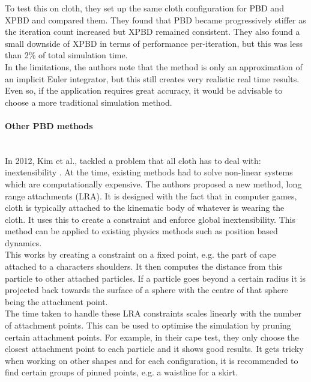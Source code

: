 \documentclass[12pt,a4paper]{article}
\begin{document}
To test this on cloth, they set up the same cloth configuration for PBD and XPBD and compared them. They found that PBD became progressively stiffer as the iteration count increased but XPBD remained consistent. They also found a small downside of XPBD in terms of performance per-iteration, but this was less than 2\% of total simulation time. \\

In the limitations, the authors note that the method is only an approximation of an implicit Euler integrator, but this still creates very realistic real time results. Even so, if the application requires great accuracy, it would be advisable to choose a more traditional simulation method.

\label{otherMethods}
\paragraph{Other PBD methods} \mbox{} \\
\label{t}
In 2012, Kim et al., tackled a problem that all cloth has to deal with: inextensibility \cite{longrange}. At the time, existing methods had to solve non-linear systems which are computationally expensive. The authors proposed a new method, long range attachments (LRA). It is designed with the fact that in computer games, cloth is typically attached to the kinematic body of whatever is wearing the cloth. It uses this to create a constraint and enforce global inextensibility. This method can be applied to existing physics methods such as position based dynamics.\\

This works by creating a constraint on a fixed point, e.g. the part of cape attached to a characters shoulders. It then computes the distance from this particle to other attached particles. If a particle goes beyond a certain radius it is projected back towards the surface of a sphere with the centre of that sphere being the attachment point.
\\

The time taken to handle these LRA constraints scales linearly with the number of attachment points. This can be used to optimise the simulation by pruning certain attachment points. For example, in their cape test, they only choose the closest attachment point to each particle and it shows good results. It gets tricky when working on other shapes and for each configuration, it is recommended to find certain groups of pinned points, e.g. a waistline for a skirt.
\\
\end{document}
